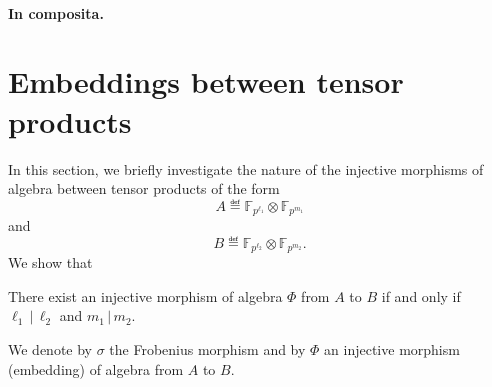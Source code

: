 \documentclass[a4paper,11pt]{article}
\begin{document}
\paragraph{In composita.}



\section{Embeddings between tensor products}
\label{sec:tensor-products}
In this section, we briefly investigate the nature of the injective morphisms of algebra
between tensor products of the form 
\[
  A\eqdef\mathbb{F}_{p^{\ell_1}}\otimes
\mathbb{F}_{p^{m_1}}
\]
and
\[
  B\eqdef\mathbb{F}_{p^{\ell_2}}\otimes\mathbb{F}_{p^{m_2}}.
\]
We show that
\begin{prop}
 There exist an injective morphism of algebra $\Phi$ from $A$ to $B$ if and only if
 $\ell_1\,|\,\ell_2$ and $m_1\,|\,m_2$. 
\end{prop}
We denote by $\sigma$ the
Frobenius morphism and by $\Phi$ an injective morphism (\ie embedding) of algebra from $A$ to
$B$.
\end{document}

